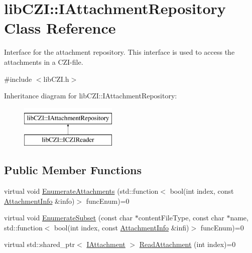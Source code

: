 \hypertarget{classlib_c_z_i_1_1_i_attachment_repository}{}\section{lib\+C\+ZI\+:\+:I\+Attachment\+Repository Class Reference}
\label{classlib_c_z_i_1_1_i_attachment_repository}


Interface for the attachment repository. This interface is used to access the attachments in a C\+Z\+I-\/file.  




{\ttfamily \#include $<$lib\+C\+Z\+I.\+h$>$}

Inheritance diagram for lib\+C\+ZI\+:\+:I\+Attachment\+Repository\+:\begin{figure}[H]
\begin{center}
\leavevmode
\includegraphics[height=2.000000cm]{classlib_c_z_i_1_1_i_attachment_repository}
\end{center}
\end{figure}
\subsection*{Public Member Functions}
\begin{DoxyCompactItemize}
\item 
virtual void \hyperlink{classlib_c_z_i_1_1_i_attachment_repository_a38f1c13a03e2dd8887d911be2c1b892b}{Enumerate\+Attachments} (std\+::function$<$ bool(int index, const \hyperlink{structlib_c_z_i_1_1_attachment_info}{Attachment\+Info} \&info)$>$ func\+Enum)=0
\item 
virtual void \hyperlink{classlib_c_z_i_1_1_i_attachment_repository_acc6b932d8d587bb8399c0236c1c29a55}{Enumerate\+Subset} (const char $\ast$content\+File\+Type, const char $\ast$name, std\+::function$<$ bool(int index, const \hyperlink{structlib_c_z_i_1_1_attachment_info}{Attachment\+Info} \&infi)$>$ func\+Enum)=0
\item 
virtual std\+::shared\+\_\+ptr$<$ \hyperlink{classlib_c_z_i_1_1_i_attachment}{I\+Attachment} $>$ \hyperlink{classlib_c_z_i_1_1_i_attachment_repository_a8f0a7a926425e39017559a95207e2d5d}{Read\+Attachment} (int index)=0
\end{DoxyCompactItemize}


